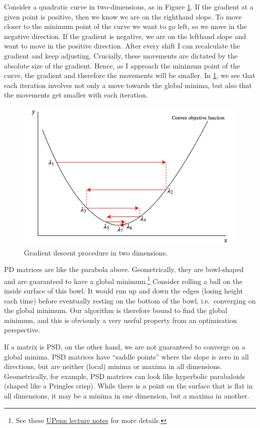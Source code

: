 \documentclass[
]{book}
\begin{document}
Consider a quadratic curve in two-dimensions, as in Figure \ref{fig:gd}. If the gradient at a given point is positive, then we know we are on the righthand slope. To move closer to the minimum point of the curve we want to go left, so we move in the negative direction. If the gradient is negative, we are on the lefthand slope and want to move in the positive direction. After every shift I can recalculate the gradient and keep adjusting. Crucially, these movements are dictated by the absolute size of the gradient. Hence, as I approach the minimum point of the curve, the gradient and therefore the movements will be smaller. In \ref{fig:gd}, we see that each iteration involves not only a move towards the global minima, but also that the movements get smaller with each iteration.

\begin{figure}
\includegraphics[width=1\linewidth]{images/sgd} \caption{Gradient descent procedure in two dimensions.}\label{fig:gd}
\end{figure}

PD matrices are like the parabola above. Geometrically, they are bowl-shaped and are guaranteed to have a global minimum.\footnote{See these \href{https://www.cis.upenn.edu/~cis515/cis515-12-sl14.pdf}{UPenn lecture notes} for more details.} Consider rolling a ball on the inside surface of this bowl. It would run up and down the edges (losing height each time) before eventually resting on the bottom of the bowl, i.e.~converging on the global minimum. Our algorithm is therefore bound to find the global minimum, and this is obviously a very useful property from an optimisation perspective.

If a matrix is PSD, on the other hand, we are not guaranteed to converge on a global minima. PSD matrices have ``saddle points'' where the slope is zero in all directions, but are neither (local) minima or maxima in all dimensions. Geometrically, for example, PSD matrices can look like hyperbolic parabaloids (shaped like a Pringles crisp). While there is a point on the surface that is flat in all dimensions, it may be a minima in one dimension, but a maxima in another.
\end{document}
